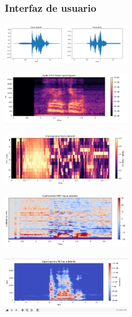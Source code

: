 \documentclass{beamer}
\begin{document}
\begin{frame}
\frametitle{Interfaz de usuario}
\centering
\begin{minipage}{0.45\textwidth}
    \centering
    \includegraphics[width=5.5cm]{figs/forma_onda.png}
\end{minipage}
\hfill
\begin{minipage}{0.45\textwidth}
    \centering
    \includegraphics[width=5.5cm]{figs/stft_spectogram.png}
\end{minipage}
\hfill
\vspace{0.3cm} %
\begin{minipage}{0.45\textwidth}
    \centering
    \includegraphics[width=5.5cm]{figs/cromagrama.png}
\end{minipage}
\hfill
\begin{minipage}{0.45\textwidth}
    \centering
    \includegraphics[width=5.5cm]{figs/coeficientes_mfc.png}
\end{minipage}
\hfill
\vspace{0.3cm} %
\begin{minipage}{0.45\textwidth}
    \centering
    \includegraphics[width=5.5cm]{figs/mel_spectrogram.png}
\end{minipage}


\end{frame}
\end{document}
